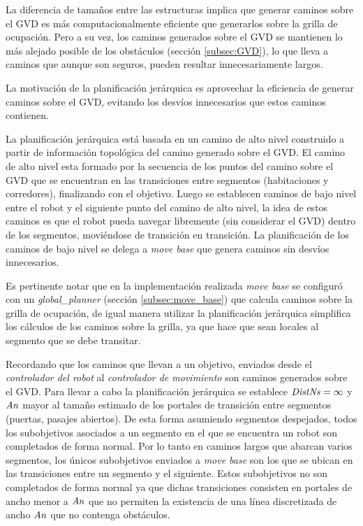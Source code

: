 La diferencia de tamaños entre las estructuras implica que generar caminos
sobre el GVD es más computacionalmente eficiente que generarlos sobre la grilla
de ocupación. Pero a su vez, los caminos generados sobre el GVD se mantienen lo
más alejado posible de los obstáculos (sección \ref{subsec:GVD}), lo que lleva
a caminos que aunque son seguros, pueden resultar innecesariamente largos.

La motivación de la planificación jerárquica es aprovechar la eficiencia de
generar caminos sobre el GVD, evitando los desvíos innecesarios que estos
caminos contienen.

La planificación jerárquica está basada en un camino de alto nivel construido a
partir de información topológica del camino generado sobre el GVD.
El camino de alto nivel esta formado por la secuencia de los puntos del camino sobre
el GVD que se encuentran en las transiciones entre segmentos (habitaciones
y corredores), finalizando con el objetivo. Luego se establecen caminos de bajo
nivel entre el robot y el siguiente punto del camino de alto nivel, la idea de
estos caminos es que el robot pueda navegar libremente (sin considerar el GVD)
dentro de los segmentos, moviéndose de transición en transición. La
planificación de los caminos de bajo nivel se delega a \emph{move base} que
genera caminos sin desvíos innecesarios.

Es pertinente notar que en la implementación realizada \emph{move base} se
configuró con un \emph{global\_planner} (sección \ref{subsec:move_base}) que
calcula caminos sobre la grilla de ocupación, de igual manera utilizar la
planificación jerárquica simplifica los cálculos de los caminos sobre la grilla,
ya que hace que sean locales al segmento que se debe transitar. %

Recordando que los caminos que llevan a un objetivo, enviados desde el
\emph{controlador del robot} al \emph{controlador de movimiento} son caminos
generados sobre el GVD. Para llevar a cabo la planificación jerárquica se
establece $\mathit{DistNs}=\infty$ y $\mathit{An}$ mayor al tamaño estimado de los
portales de transición entre segmentos (puertas, pasajes abiertos). De esta
forma asumiendo segmentos despejados, todos los subobjetivos asociados a un
segmento en el que se encuentra un robot son completados de forma normal. Por
lo tanto en caminos largos que abarcan varios segmentos, los únicos
subobjetivos enviados a \emph{move base} son los que se ubican en las
transiciones entre un segmento y el siguiente. Estos subobjetivos no son
completados de forma normal ya que dichas transiciones consisten en portales de
ancho menor a $\mathit{An}$ que no permiten la existencia de una línea discretizada
de ancho $\mathit{An}$ que no contenga obstáculos.

